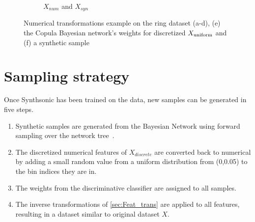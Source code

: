 \begin{figure}[htp]
\begin{subfigure}{0.3\textwidth}
\caption{$X_{num}$ and $X_{syn}$}
\end{subfigure}
\caption{Numerical transformations example on the ring dataset (a-d), (e) the Copula Bayesian network's weights  for discretized $X_{\rm uniform}$ and (f) a synthetic sample~\cite{AuthorSynthsonic:Data}}
\label{fig:transformation}
\end{figure}


\section{Sampling strategy}
Once Synthsonic has been trained on the data, new samples can be generated in five steps.
\begin{enumerate}
    \item Synthetic samples are generated from the Bayesian Network using forward sampling over the network tree~\cite{Guo2002AInference}.
    \item The discretized numerical features of $X_{discrete}$ are converted back to numerical by adding a small random value from a uniform distribution from (0,0.05) to the bin indices they are in. 
    \item The weights from the discriminative classifier are assigned to all samples. 
    \item The inverse transformations of \ref{sec:Feat_trans} are applied to all features, resulting in a dataset similar to original dataset $X$.
\end{enumerate}
